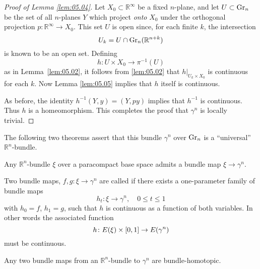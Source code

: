 \documentclass[../main]{subfiles}
\begin{document}
\begin{proof}[Proof of Lemma \ref{lem:05.04}] Let $X_0 \subset \mathbb{R}^\infty$ be a fixed $n$-plane, and let
$U \subset \operatorname{Gr}_n$ be the set of all $n$-planes $Y$ which project \emph{onto} $X_0$ under the
orthogonal projection $p\colon \mathbb{R}^\infty \to X_0$. This set $U$ is open since, for each
finite $k$, the intersection
\[
U_k=U\cap \operatorname{Gr}_n(\mathbb{R}^{n+k})
\]
is known to be an open set. Defining
\[
h\colon U\times X_0\to \pi^{-1}(U)
\]
as in Lemma~\ref{lem:05.02}, it follows from \ref{lem:05.02} that $h|_{U_k \times X_0}$ is continuous for each $k$.
Now Lemma \ref{lem:05.05} implies that $h$ itself is continuous.

As before, the identity $h^{-1}(Y,y) = (Y,py)$ implies that $h^{-1}$ is continuous. Thus $h$ is a homeomorphism. This completes the proof that
$\gamma^n$ is locally trivial.
\end{proof}

The following two theorems assert that this bundle $\gamma^n$ over $\operatorname{Gr}_n$ is a
``universal'' $\mathbb{R}^n$-bundle.
\begin{theorem}\label{thm:05.06} Any $\mathbb{R}^n$-bundle $\xi$ over a paracompact base space admits a bundle map $\xi\to \gamma^n$.
\end{theorem}

Two bundle maps, $f, g\colon \xi\to \gamma^n$ are called  if there
exists a one-parameter family of bundle maps
\[
h_t\colon \xi\to \gamma^n, \quad 0\leq t\leq 1
\]
with $h_0 = f$, $h_1 = g$, such that $h$ is continuous as a function of both
variables. In other words the associated function
\[
h\colon E(\xi)\times [0,1]\to E(\gamma^n)
\]
must be continuous.
\begin{theorem}\label{thm:05.07} Any two bundle maps from an $\mathbb{R}^n$-bundle to $\gamma^n$
are bundle-homotopic.
\end{theorem}
\end{document}

